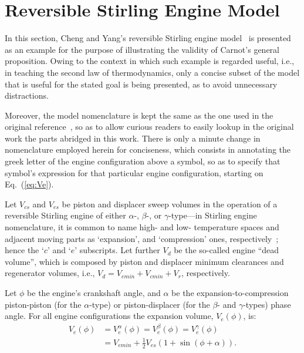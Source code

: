 \section{Reversible Stirling Engine Model}

    In     this     section,     Cheng     and     Yang's     reversible     Stirling     engine
    model~\cite{2012-ChengCH+YangHS-ApEnergy} is presented as an  example  for  the  purpose  of
    illustrating the validity of Carnot's general proposition. Owing to  the  context  in  which
    such example is regarded useful, i.e., in teaching the second law of thermodynamics, only  a
    concise subset of the model that is useful for the stated goal is  being  presented,  as  to
    avoid unnecessary distractions.

    Moreover, the model nomenclature  is  kept  the  same  as  the  one  used  in  the  original
    reference~\cite{2012-ChengCH+YangHS-ApEnergy}, so as to  allow  curious  readers  to  easily
    lookup in the original work the parts abridged in this work. There is only a  minute  change
    in nomenclature employed herein for conciseness, which  consists  in  annotating  the  greek
    letter of the engine configuration above a symbol, so as to specify that symbol's expression
    for that particular engine configuration, starting on Eq.~(\ref{eq:Ve}).

    Let $V_{cs}$ and $V_{es}$ be piston and displacer  sweep  volumes  in  the  operation  of  a
    reversible Stirling engine of either $\alpha$-,  $\beta$-,  or  $\gamma$-type---in  Stirling
    engine nomenclature, it is common to name high- and low-  temperature  spaces  and  adjacent
    moving       parts       as        `expansion',        and        `compression'        ones,
    respectively~\cite{2013-CengelYA+BolesMA-AMGH}; hence the `$c$' and  `$e$'  subscripts.  Let
    further $V_d$ be the so-called engine ``dead volume'',  which  is  composed  by  piston  and
    displacer minimum clearances and regenerator volumes, i.e., $V_d =  V_{emin}  +  V_{cmin}  +
    V_r$, respectively.

    Let $\phi$ be the engine's crankshaft angle, and $\alpha$  be  the  expansion-to-compression
    piston-piston  (for  the  $\alpha$-type)  or  piston-displacer   (for   the   $\beta$-   and
    $\gamma$-types)  phase  angle.  For  all  engine  configurations   the   expansion   volume,
    $V_e(\phi)$, is:
    \begin{align}
        \label{eq:Ve}
        V_e(\phi) &= V^{\alpha}_e(\phi) = V^{\beta}_e(\phi) = V^{\gamma}_e(\phi) \nonumber\\
                  &= V_{emin} + \frac{1}{2} V_{es}(1 + \sin(\phi + \alpha)).
    \end{align}

